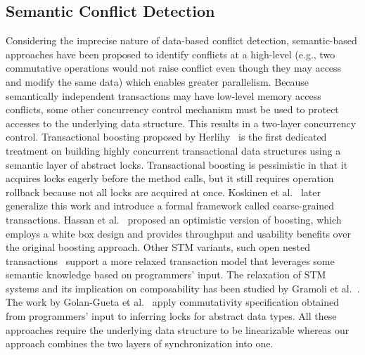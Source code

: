 \documentclass[10pt,conference,compsocconf]{IEEEtran}
\begin{document}
\subsection{Semantic Conflict Detection}
Considering the imprecise nature of data-based conflict detection, semantic-based approaches have been proposed to identify conflicts at a high-level (e.g., two commutative operations would not raise conflict even though they may access and modify the same data) which enables greater parallelism.
Because semantically independent transactions may have low-level memory access conflicts, some other concurrency control mechanism must be used to protect accesses to the underlying data structure.
This results in a two-layer concurrency control.
Transactional boosting proposed by Herlihy~\cite{herlihy2008transactional} is the first dedicated treatment on building highly concurrent transactional data structures using a semantic layer of abstract locks. 
Transactional boosting is pessimistic in that it acquires locks eagerly before the method calls, but it still requires operation rollback because not all locks are acquired at once.
Koskinen et al.~\cite{koskinen2010coarse} later generalize this work and introduce a formal framework called coarse-grained transactions.
Hassan et al.~\cite{hassan2014developing} proposed an optimistic version of boosting, which employs a white box design and provides throughput and usability benefits over the original boosting approach.
Other STM variants, such open nested transactions~\cite{ni2007open} support a more relaxed transaction model that leverages some semantic knowledge based on programmers' input.
The relaxation of STM systems and its implication on composability has been studied by Gramoli et al.~\cite{gramoli2013composing}.
The work by Golan-Gueta et al.~\cite{golan2015automatic} apply commutativity specification obtained from programmers' input to inferring locks for abstract data types.
All these approaches require the underlying data structure to be linearizable whereas our approach combines the two layers of synchronization into one.
\end{document}
